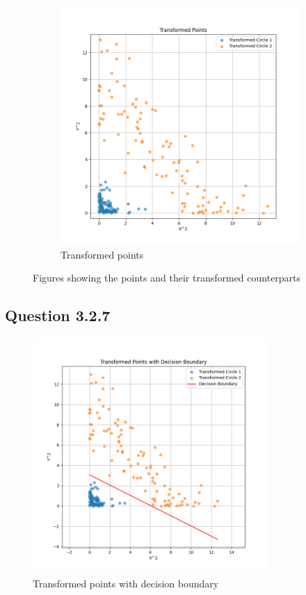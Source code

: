 \documentclass{article}
\begin{document}
\begin{figure}[H]
\begin{subfigure}{0.45\textwidth}
        \includegraphics[width=\textwidth]{transformed_points.png}
        \caption{Transformed points}
    \end{subfigure}
    \caption{Figures showing the points and their transformed counterparts}
\end{figure}

\subsection{Question 3.2.7}

\begin{figure}[H]
    \centering
    \includegraphics[width=0.8\textwidth]{transformed_points_with_decision_boundary.png}
    \caption{Transformed points with decision boundary}
\end{figure}
\end{document}
